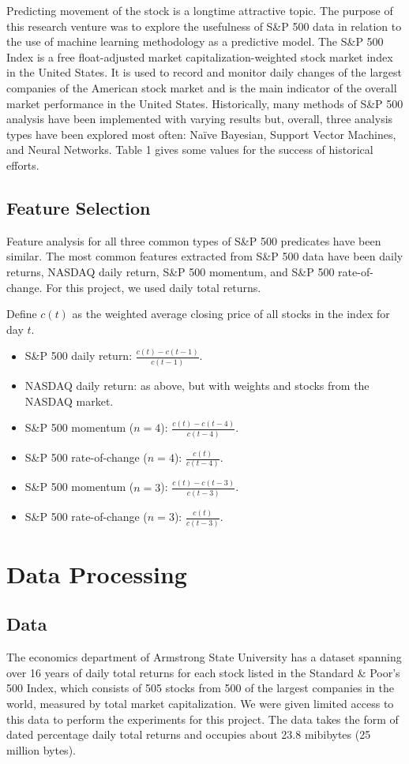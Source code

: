 \documentclass[format=acmlarge]{acmart}
\begin{document}
Predicting movement of the stock is a longtime attractive topic.  The purpose of this research venture was to explore the usefulness of S\&P 500 data in relation to the use of machine learning methodology as a predictive model. The S\&P 500 Index is a free float-adjusted market capitalization-weighted stock market index in the United States. It is used to record and monitor daily changes of the largest companies of the American stock market and is the main indicator of the overall market performance in the United States.  Historically, many methods of S\&P 500 analysis have been implemented with varying results but, overall, three analysis types have been explored most often: Na\"{i}ve Bayesian, Support Vector Machines, and Neural Networks.  Table 1 gives some values for the success of historical efforts.

\subsection{Feature Selection}
Feature analysis for all three common types of S\&P 500 predicates have been similar.  The most common features extracted from S\&P 500 data have been daily returns, NASDAQ daily return, S\&P 500 momentum, and S\&P 500 rate-of-change.  For this project, we used daily total returns.

Define $c(t)$ as the weighted average closing price of all stocks in the index for day $t$.
\begin{itemize}
  \item S\&P 500 daily return: $\frac{c(t) - c(t-1)}{c(t-1)}$.
  \item NASDAQ daily return: as above, but with weights and stocks from the NASDAQ market.
  \item S\&P 500 momentum ($n = 4$): $\frac{c(t) - c(t-4)}{c(t-4)}$.
  \item S\&P 500 rate-of-change ($n = 4$): $\frac{c(t)}{c(t-4)}$.
  \item S\&P 500 momentum ($n = 3$): $\frac{c(t) - c(t-3)}{c(t-3)}$.
  \item S\&P 500 rate-of-change ($n = 3$): $\frac{c(t)}{c(t-3)}$.
\end{itemize}

\section{Data Processing}
\subsection{Data}
The economics department of Armstrong State University has a dataset spanning over 16 years of daily total returns for each stock listed in the Standard \& Poor's 500 Index, which consists of 505 stocks from 500 of the largest companies in the world, measured by total market capitalization.  We were given limited access to this data to perform the experiments for this project.  The data takes the form of dated percentage daily total returns and occupies about 23.8 mibibytes (25 million bytes).
\end{document}
